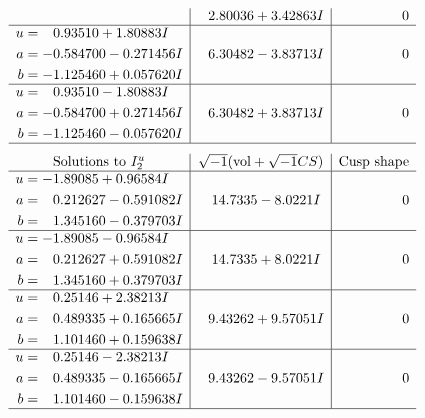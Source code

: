 \documentclass[1p]{elsarticle_modified}
\theoremstyle{definition}
\newcommand{\I}{\sqrt{-1}}
\begin{document}
$$\begin{array}{c|c|c}
 & \phantom{-}2.80036 + 3.42863 I & \phantom{-0.000000 } 0 \\ \hline\begin{aligned}
u &= \phantom{-}0.93510 + 1.80883 I \\
a &= -0.584700 - 0.271456 I \\
b &= -1.125460 + 0.057620 I\end{aligned}
 & \phantom{-}6.30482 - 3.83713 I & \phantom{-0.000000 } 0 \\ \hline\begin{aligned}
u &= \phantom{-}0.93510 - 1.80883 I \\
a &= -0.584700 + 0.271456 I \\
b &= -1.125460 - 0.057620 I\end{aligned}
 & \phantom{-}6.30482 + 3.83713 I & \phantom{-0.000000 } 0\\
 \hline 
 \end{array}$$\newpage$$\begin{array}{c|c|c}  
\text{Solutions to }I^u_{2}& \I (\text{vol} + \sqrt{-1}CS) & \text{Cusp shape}\\
 \hline 
\begin{aligned}
u &= -1.89085 + 0.96584 I \\
a &= \phantom{-}0.212627 - 0.591082 I \\
b &= \phantom{-}1.345160 - 0.379703 I\end{aligned}
 & \phantom{-}14.7335 - 8.0221 I & \phantom{-0.000000 } 0 \\ \hline\begin{aligned}
u &= -1.89085 - 0.96584 I \\
a &= \phantom{-}0.212627 + 0.591082 I \\
b &= \phantom{-}1.345160 + 0.379703 I\end{aligned}
 & \phantom{-}14.7335 + 8.0221 I & \phantom{-0.000000 } 0 \\ \hline\begin{aligned}
u &= \phantom{-}0.25146 + 2.38213 I \\
a &= \phantom{-}0.489335 + 0.165665 I \\
b &= \phantom{-}1.101460 + 0.159638 I\end{aligned}
 & \phantom{-}9.43262 + 9.57051 I & \phantom{-0.000000 } 0 \\ \hline\begin{aligned}
u &= \phantom{-}0.25146 - 2.38213 I \\
a &= \phantom{-}0.489335 - 0.165665 I \\
b &= \phantom{-}1.101460 - 0.159638 I\end{aligned}
 & \phantom{-}9.43262 - 9.57051 I & \phantom{-0.000000 } 0\\
 \hline 
 \end{array}$$\newpage\newpage\renewcommand{\arraystretch}{1}
\end{document}
